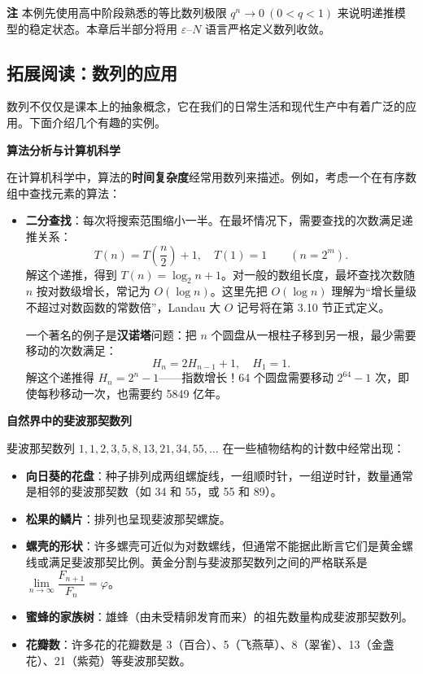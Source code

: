 \documentclass[fontset=fandol]{ctexart}
\newenvironment{remark}{\par\noindent\textbf{注}\quad}{\par\vspace{0.8em}}
\begin{document}
\begin{remark}
本例先使用高中阶段熟悉的等比数列极限 $q^n\to0\ (0<q<1)$ 来说明递推模型的稳定状态。本章后半部分将用 $\varepsilon$--$N$ 语言严格定义数列收敛。
\end{remark}



\subsection*{拓展阅读：数列的应用}

数列不仅仅是课本上的抽象概念，它在我们的日常生活和现代生产中有着广泛的应用。下面介绍几个有趣的实例。

\textbf{算法分析与计算机科学}

在计算机科学中，算法的\textbf{时间复杂度}经常用数列来描述。例如，考虑一个在有序数组中查找元素的算法：

\begin{itemize}
\item \textbf{二分查找}：每次将搜索范围缩小一半。在最坏情况下，需要查找的次数满足递推关系：
\[
T(n) = T\left(\dfrac{n}{2}\right) + 1,\quad T(1) = 1\qquad(n=2^m).
\]
解这个递推，得到 \(T(n)=\log_2 n+1\)。对一般的数组长度，最坏查找次数随 $n$ 按对数级增长，常记为 \(O(\log n)\)。这里先把 \(O(\log n)\) 理解为“增长量级不超过对数函数的常数倍”，Landau 大 \(O\) 记号将在第 3.10 节正式定义。


一个著名的例子是\textbf{汉诺塔}问题：把 \(n\) 个圆盘从一根柱子移到另一根，最少需要移动的次数满足：
\[
H_n = 2H_{n-1} + 1,\quad H_1 = 1.
\]
解这个递推得 \(H_n = 2^n - 1\)——指数增长！64 个圆盘需要移动 \(2^{64}-1\) 次，即使每秒移动一次，也需要约 5849 亿年。
\end{itemize}

\textbf{自然界中的斐波那契数列}

斐波那契数列 \(1, 1, 2, 3, 5, 8, 13, 21, 34, 55, \ldots\) 在一些植物结构的计数中经常出现：

\begin{itemize}
\item \textbf{向日葵的花盘}：种子排列成两组螺旋线，一组顺时针，一组逆时针，数量通常是相邻的斐波那契数（如 34 和 55，或 55 和 89）。
\item \textbf{松果的鳞片}：排列也呈现斐波那契螺旋。
\item \textbf{螺壳的形状}：许多螺壳可近似为对数螺线，但通常不能据此断言它们是黄金螺线或满足斐波那契比例。黄金分割与斐波那契数列之间的严格联系是 \(\lim\limits_{n \to \infty} \dfrac{F_{n+1}}{F_n}=\varphi\)。
\item \textbf{蜜蜂的家族树}：雄蜂（由未受精卵发育而来）的祖先数量构成斐波那契数列。
\item \textbf{花瓣数}：许多花的花瓣数是 3（百合）、5（飞燕草）、8（翠雀）、13（金盏花）、21（紫菀）等斐波那契数。
\end{itemize}
\end{document}
